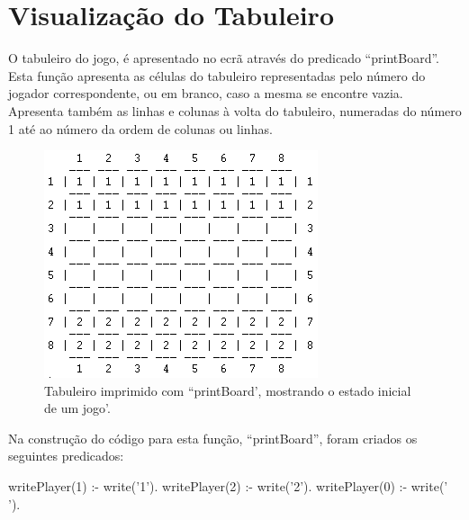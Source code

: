 \documentclass[15pt,a4paper]{article}
\begin{document}

\section{Visualização do Tabuleiro}


O tabuleiro do jogo, é apresentado no ecrã através do predicado ``printBoard''.
Esta função apresenta as células do tabuleiro representadas pelo número do jogador correspondente, ou em branco, caso a mesma se encontre vazia.
Apresenta também as linhas e colunas à volta do tabuleiro, numeradas do número 1 até ao número da ordem de colunas ou linhas.

\begin{figure}[h!]
\begin{center}
\includegraphics[scale=1]{fig_tab.png}
\caption{Tabuleiro imprimido com ``printBoard', mostrando o estado inicial de um jogo'.}
\label{fig:3}
\end{center}
\end{figure}

Na construção do código para esta função, ``printBoard'', foram criados os seguintes predicados:

\begin{code}[H]
	\begin{verbatimtab}

writePlayer(1) :-
	write('1').
writePlayer(2) :-
	write('2').
writePlayer(0) :-
	write(' ').
\end{verbatimtab}
\caption{Predicado ``writePlayer' .}
\end{code}
\end{document}

